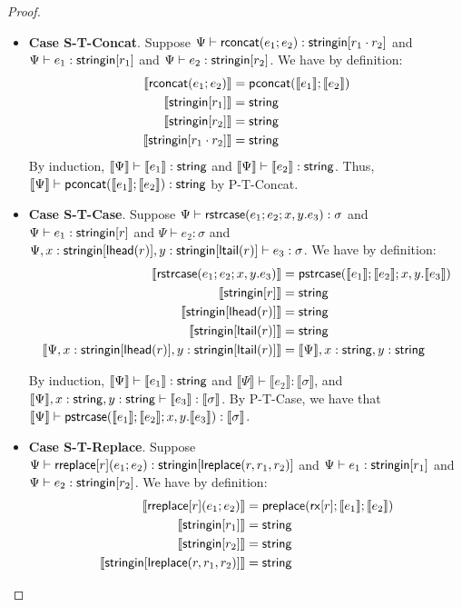 \documentclass[11pt,leqno]{article}
\theoremstyle{definition}
\newcommand{\stringin}[1]{{\sf stringin}[#1]}
\newcommand{\preplace}[3]{{\sf preplace}(#1;#2;#3)}
\newcommand{\tconcat}[2]{{\sf pconcat}(#1;#2)} %
\newcommand{\rx}[1]{ {\sf rx}[#1] }
\newcommand{\str}{{\sf string}}
\newcommand{\lreplace}[3]{{\sf lreplace}(#1; #2; #3)}
\newcommand{\sctx}{\Psi} %
\newcommand{\strcase}[3]{ {\sf rstrcase}(#1; #2; #3)}
\newcommand{\pstrcase}[3]{ {\sf pstrcase}(#1; #2; #3)}
\newcommand{\lhead}[1]{ {\sf lhead}(#1) }
\newcommand{\ltail}[1]{ {\sf ltail}(#1) }
\newcommand{\trden}[1]{\llbracket #1 \rrbracket} %
\renewcommand{\lreplace}[3]{{\sf lreplace}(#1, #2, #3)}
\begin{document}
\begin{proof}
\begin{itemize}[label=$ $,itemsep=1ex]
\item \textbf{Case S-T-Concat}.
Suppose $\sctx \vdash \rconcat{e_1}{e_2} : \stringin{r_1 \cdot r_2}$ and $\sctx \vdash e_1 : \stringin{r_1}$ and $\sctx \vdash e_2 : \stringin{r_2}$. We have by definition:
\begin{align*}
\trden{\rconcat{e_1}{e_2}} &= \tconcat{\trden{e_1}}{\trden{e_2}}\\
\trden{\stringin{r_1}} &= \str\\
\trden{\stringin{r_2}} &= \str\\
\trden{\stringin{r_1 \cdot r_2}} &= \str
\end{align*}
By induction, $\trden{\sctx} \vdash \trden{e_1} : \str$ and $\trden{\sctx} \vdash \trden{e_2} : \str$.
Thus, $\trden{\sctx} \vdash \tconcat{\trden{e_1}}{\trden{e_2}} : \str$ by P-T-Concat.

\item \textbf{Case S-T-Case}.
Suppose $\sctx \vdash \strcase{e_1}{e_2}{x,y.e_3} : \sigma$ and $\sctx \vdash e_1 : \stringin{r}$ and $\sctx \vdash e_2 : \sigma$ and $\sctx, x : \stringin{\lhead{r}}, y : \stringin{\ltail{r}} \vdash e_3 : \sigma$. We have by definition:
\begin{align*}
\trden{\strcase{e_1}{e_2}{x, y.e_3}} &= \pstrcase{\trden{e_1}}{\trden{e_2}}{x, y.\trden{e_3}}\\
\trden{\stringin{r}} &= \str\\
\trden{\stringin{\lhead{r}}} &= \str\\
\trden{\stringin{\ltail{r}}} &= \str\\
\trden{\sctx, x : \stringin{\lhead{r}}, y : \stringin{\ltail{r}}} &= \trden{\sctx}, x : \str, y : \str
\end{align*}

By induction, $\trden{\sctx} \vdash \trden{e_1} : \str$ and 
$\trden{\sctx} \vdash \trden{e_2} : \trden{\sigma}$, and
$\trden{\sctx}, x : \str, y : \str \vdash \trden{e_3} : \trden{\sigma}$.
By P-T-Case, we have that $\trden{\sctx} \vdash \pstrcase{\trden{e_1}}{\trden{e_2}}{x, y.\trden{e_3}} : \trden{\sigma}$.

\item \textbf{Case S-T-Replace}.
Suppose $\sctx \vdash \rreplace{r}{e_1}{e_2} : \stringin{\lreplace{r}{r_1}{r_2}}$ and $\sctx \vdash e_1 : \stringin{r_1}$ and $\sctx \vdash e_2 : \stringin{r_2}$. We have by definition:
\begin{align*}
\trden{\rreplace{r}{e_1}{e_2}} &= \preplace{\rx{r}}{\trden{e_1}}{\trden{e_2}}\\
\trden{\stringin{r_1}} &= \str\\
\trden{\stringin{r_2}} &= \str\\
\trden{\stringin{\lreplace{r}{r_1}{r_2}}} &= \str
\end{align*}


\end{itemize}
\end{proof}
\end{document}
